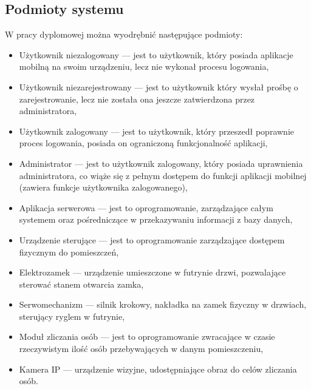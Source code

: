 \subsection{Podmioty systemu} 
W pracy dyplomowej można wyodrębnić następujące podmioty:
	\begin{itemize}
	\item {Użytkownik niezalogowany} --- jest to użytkownik, który posiada aplikacje mobilną na swoim urządzeniu, lecz nie wykonał procesu logowania,
	\item {Użytkownik niezarejestrowany} --- jest to użytkownik który wysłał prośbę o zarejestrowanie, lecz nie została ona jeszcze zatwierdzona przez administratora,
	\item {Użytkownik zalogowany} --- jest to użytkownik, który przeszedł poprawnie proces logowania, posiada on ograniczoną funkcjonalność aplikacji,
	\item {Administrator} --- jest to użytkownik zalogowany, który posiada uprawnienia administratora, co wiąże się z pełnym dostępem do funkcji aplikacji mobilnej (zawiera funkcje użytkownika zalogowanego),
	\item {Aplikacja serwerowa} --- jest to oprogramowanie, zarządzające całym systemem oraz pośredniczące w przekazywaniu informacji z bazy danych,
	\item {Urządzenie sterujące} --- jest to oprogramowanie zarządzające dostępem fizycznym do pomieszczeń,
	\item {Elektrozamek} --- urządzenie umieszczone w futrynie drzwi, pozwalające sterować stanem otwarcia zamka,
	\item {Serwomechanizm} --- silnik krokowy, nakładka na zamek fizyczny w drzwiach, sterujący ryglem w futrynie,
	\item {Moduł zliczania osób} --- jest to oprogramowanie zwracające w czasie rzeczywistym ilość osób przebywających w danym pomieszczeniu,
	\item {Kamera IP} --- urządzenie wizyjne, udostępniające obraz do celów zliczania osób.
\end{itemize}